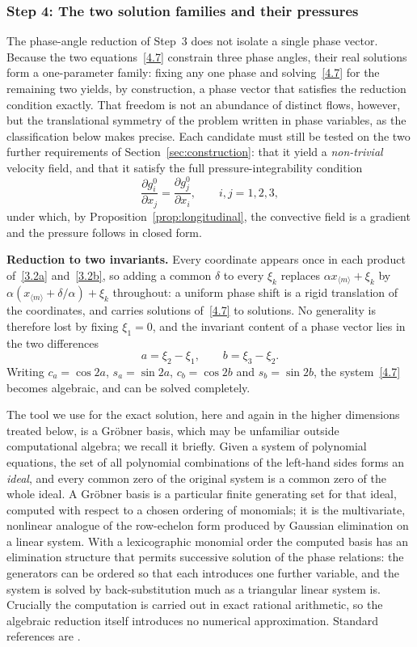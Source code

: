\documentclass[11pt]{jfm}
\numberwithin{equation}{section}
\begin{document}
\subsubsection{Step 4: The two solution families and their pressures}
The phase-angle reduction of Step~3 does not isolate a single phase vector. Because the two
equations~\eqref{4.7} constrain three phase angles, their real solutions form a one-parameter
family: fixing any one phase and solving~\eqref{4.7} for the remaining two yields, by
construction, a phase vector that satisfies the reduction condition exactly. That freedom is
not an abundance of distinct flows, however, but the translational symmetry of the problem
written in phase variables, as the classification below makes precise. Each candidate must still be tested
on the two further requirements of Section~\ref{sec:construction}: that it yield a
\emph{non-trivial} velocity field, and that it satisfy the full pressure-integrability condition
\[
\frac{\partial g_i^0}{\partial x_j}=\frac{\partial g_j^0}{\partial x_i},
\qquad i,j=1,2,3,
\]
under which, by Proposition~\ref{prop:longitudinal}, the convective field is a gradient and the
pressure follows in closed form.

\medskip
\noindent\textbf{Reduction to two invariants.} Every coordinate appears once in each product
of~\eqref{3.2a} and~\eqref{3.2b}, so adding a common $\delta$ to every $\xi_k$ replaces
$\alpha x_{\langle m\rangle}+\xi_k$ by $\alpha(x_{\langle m\rangle}+\delta/\alpha)+\xi_k$
throughout: a uniform phase shift is a rigid translation of the coordinates, and carries solutions
of~\eqref{4.7} to solutions. No generality is therefore lost by fixing $\xi_1=0$, and the invariant
content of a phase vector lies in the two differences
\[
a=\xi_2-\xi_1,\qquad b=\xi_3-\xi_2 .
\]
Writing $c_a=\cos2a$, $s_a=\sin2a$, $c_b=\cos2b$ and $s_b=\sin2b$, the system~\eqref{4.7} becomes
algebraic, and can be solved completely.

The tool we use for the exact solution, here and again in the higher dimensions treated below, is
a Gr\"obner basis, which may be unfamiliar outside computational algebra; we recall it briefly.
Given a system of polynomial equations, the set of all polynomial combinations of the left-hand
sides forms an \emph{ideal}, and every common zero of the original system is a common zero of the
whole ideal. A Gr\"obner basis is a particular finite generating set for that ideal, computed with
respect to a chosen ordering of monomials; it is the multivariate, nonlinear analogue of the
row-echelon form produced by Gaussian elimination on a linear system. With a lexicographic
monomial order the computed basis has an elimination structure that permits successive solution of
the phase relations: the generators can be ordered so that each introduces one further variable,
and the system is solved by back-substitution much as a triangular linear system is. Crucially the
computation is carried out in exact rational arithmetic, so the algebraic reduction itself
introduces no numerical approximation. Standard references are \citet{cox2015ideals}.
\end{document}
